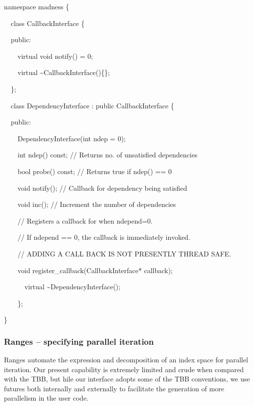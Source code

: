 \documentclass[letterpaper]{article}
\begin{document}
{\ttfamily
namespace madness \{}

{\ttfamily
\ \ class CallbackInterface \{}

{\ttfamily
\ \ public:}

{\ttfamily
\ \ \ \ virtual void notify() = 0;}

{\ttfamily
\ \ \ \ virtual \~{}CallbackInterface()\{\};}

{\ttfamily
\ \ \};}


\bigskip

{\ttfamily
\ \ class DependencyInterface : public CallbackInterface \{}

{\ttfamily
\ \ public:}

{\ttfamily
\ \ \ \ DependencyInterface(int ndep = 0);}

{\ttfamily
\ \ \ \ int ndep() const; // Returns no. of unsatisfied dependencies}

{\ttfamily
\ \ \ \ bool probe() const; // Returns true if ndep() == 0}

{\ttfamily
\ \ \ \ void notify(); // Callback for dependency being satisfied}

{\ttfamily
\ \ \ \ void inc(); // Increment the number of dependencies}


\bigskip

{\ttfamily
\ \ \ \ // Registers a callback for when ndepend=0.}

{\ttfamily
\ \ \ \ // If ndepend == 0, the callback is immediately invoked.}

{\ttfamily
\ \ \ \ // ADDING A CALL BACK IS NOT PRESENTLY THREAD SAFE.}

{\ttfamily
\ \ \ \ void register\_callback(CallbackInterface* callback);}


\bigskip

{\ttfamily
\ \ \ \ \ \ virtual \~{}DependencyInterface();}

{\ttfamily
\ \ \ \ \};}

\}

\subsubsection{Ranges -- specifying parallel iteration}
Ranges automate the expression and decomposition of an index space for parallel iteration. Our present capability is
extremely limited and crude when compared with the TBB, but hile our interface adopts some of the TBB conventions, we
use futures both internally and externally to facilitate the generation of more parallelism in the user code.
\end{document}
